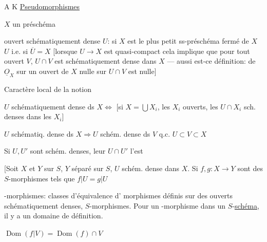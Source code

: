 A K
\hfill\uline{Pseudomorphismes}

$X$ un préschéma

ouvert schématiquement dense $U$: si $X$ est le plus petit ss-préschéma fermé de $X$  $U$ i.e. si $\overline U=X$ [lorsque $U\to X$ est quasi-compact cela implique que pour tout ouvert $V$, $U\cap V$ est schématiquement dense dans $X$ --- aussi est-ce  définition:  \uline{} de $\underline O_X$ sur un ouvert de $X$ nulle sur $U\cap V$ est nulle]

Caractère local de la notion

$U$ schématiquement dense ds $X\Longleftrightarrow$ [si $X=\bigcup X_i$, les $X_i$ ouverts, les $U\cap X_i$ sch. denses dans les $X_i$]

$U$ schématiq. dense ds $X\Longrightarrow U$ schém. dense ds  $V$ q.c. $U\subset V\subset X$

Si $U,U'$ sont schém. denses, leur $U\cap U'$ l'est

[Soit $X$ et $Y$ sur $S$,  $Y$ séparé sur $S$,  $U$ schém. dense dans $X$. Si $f,g:X\to Y$ sont des $S$-morphismes tels que $f|U=g|U$

-morphismes: classes d'équivalence d' morphismes définis sur des ouverts schématiquement denses,  $S$-morphismes. Pour un -morphisme dans un $S$-\uline{schéma}, il y a un domaine  de définition.

 $\operatorname{Dom}(f|V)=\operatorname{Dom}(f)\cap V$

